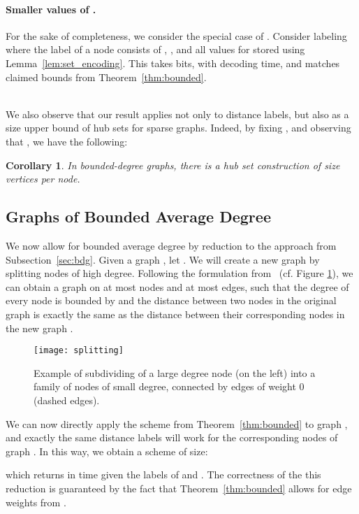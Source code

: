 \documentclass{article}[11pt,letter]
\newtheorem{corollary}[definition]{Corollary}
\begin{document}
\paragraph{Smaller values of .} For the sake of completeness, we consider the special case of . Consider labeling where the label of a node
 consists of , , and all values  for  stored using
Lemma~\ref{lem:set_encoding}. This takes  bits, with  decoding time, and matches claimed bounds from Theorem~\ref{thm:bounded}.

\ \\
We also observe that our result applies not only to distance labels, but also as a size upper bound of hub sets for sparse graphs. Indeed, by fixing , and observing that , we have the following:
\begin{corollary}
In bounded-degree graphs, there is a hub set construction of size  vertices per node.
\end{corollary}

\subsection{Graphs of Bounded Average Degree}
\label{sec:bounded_average}

We now allow for bounded average degree by reduction to the approach from Subsection~\ref{sec:bdg}. Given a graph , let . We will create a new graph by splitting nodes of high degree. Following the formulation from~\cite[Lemma 4.2]{Stretch} (cf. Figure \ref{fig:splitting}), we can obtain a graph  on at most  nodes and at most  edges, such that the degree of every node is bounded by  and the distance between two nodes in the original graph  is exactly the same as the distance between their corresponding nodes in the new graph .
\begin{figure}[t]
  \centering
    \vspace*{-2mm}
    \texttt{[image: splitting]}
    \vspace*{-2mm}
    \caption{Example of subdividing of a large degree node (on the left) into a family of nodes of small degree, connected by edges of weight 0 (dashed edges).}
    \label{fig:splitting}
\end{figure}
We can now directly apply the scheme from Theorem~\ref{thm:bounded} to graph , and exactly the same distance labels will work for the corresponding nodes of graph . In this way, we obtain a scheme of size:

which returns  in  time given the labels of  and . The correctness of the this reduction is guaranteed by the fact that Theorem~\ref{thm:bounded} allows for edge weights from .
\end{document}
